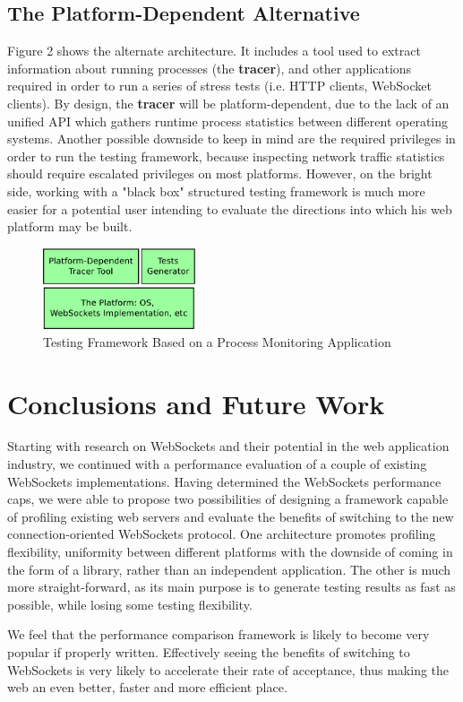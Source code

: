 \documentclass[conference]{IEEEtran}
\begin{document}
\subsection{The Platform-Dependent Alternative}
Figure 2 shows the alternate architecture. It includes a tool used to extract
information about running processes (the \textbf{tracer}), and other applications
required in order to run a series of stress tests (i.e. HTTP clients, WebSocket
clients). By design, the \textbf{tracer} will be platform-dependent, due to the
lack of an unified API which gathers runtime process statistics between different
operating systems. Another possible downside to keep in mind are the required
privileges in order to run the testing framework, because inspecting network
traffic statistics should require escalated privileges on most platforms. However,
on the bright side, working with a "black box" structured testing framework is
much more easier for a potential user intending to evaluate the directions into
which his web platform may be built.
\\
\begin{frame}{}
  \begin{figure}
    \centering
    \includegraphics[width=0.4\textwidth]{img/architecture2.pdf}
    \caption{Testing Framework Based on a Process Monitoring Application}
  \end{figure}
\end{frame}
\indent

\section{Conclusions and Future Work}
Starting with research on WebSockets and their potential in the web application
industry, we continued with a performance evaluation of a couple of existing
WebSockets implementations. Having determined the WebSockets performance caps,
we were able to propose two possibilities of designing a framework capable of
profiling existing web servers and evaluate the benefits of switching to the new 
connection-oriented WebSockets protocol. One architecture promotes profiling
flexibility, uniformity between different platforms with the downside of coming in
the form of a library, rather than an independent application. The other is much
more straight-forward, as its main purpose is to generate testing results as fast
as possible, while losing some testing flexibility.

We feel that the performance comparison framework is likely to become very popular
if properly written. Effectively seeing the benefits of switching to WebSockets
is very likely to accelerate their rate of acceptance, thus making the web an
even better, faster and more efficient place.

{}

\end{document}
